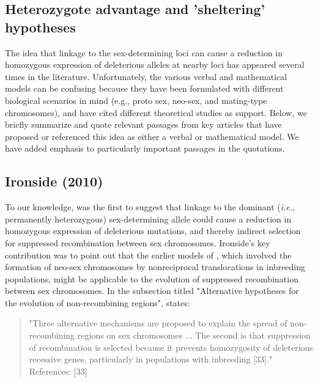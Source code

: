 \documentclass{article}
\begin{document}
\begin{appendices}
 \section{Heterozygote advantage and 'sheltering' hypotheses} \label{Sheltering-App}
 \renewcommand{\theequation}{A\arabic{equation}}
 \setcounter{equation}{0}
 \renewcommand{\thefigure}{A\arabic{figure}}
 \setcounter{figure}{0}

The idea that linkage to the sex-determining loci can cause a reduction in homozygous expression of deleterious alleles at nearby loci has appeared several times in the literature. Unfortunately, the various verbal and mathematical models can be confusing because they have been formulated with different biological scenarios in mind (e.g., proto sex, neo-sex, and mating-type chromosomes), and have cited different theoretical studies as support. Below, we briefly summarize and quote relevant passages from key articles that have proposed or referenced this idea as either a verbal or mathematical model. We have added emphasis to particularly important passages in the quotations.


\subsection*{Ironside (2010)}

To our knowledge, \citet{Ironside2010} was the first to suggest that linkage to the dominant ({\itshape i.e.}, permanently heterozygous) sex-determining allele could cause a reduction in homozygous expression of deleterious mutations, and thereby indirect selection for suppressed recombination between sex chromosomes. Ironside's key contribution was to point out that the earlier models of \citet{CharlesworthWall1999}, which involved the formation of neo-sex chromosomes by nonreciprocal translocations in inbreeding populations, might be applicable to the evolution of suppressed recombination between sex chromosomes. In the subsection titled "Alternative hypotheses for the evolution of non-recombining regions", \citet{Ironside2010} states:
	\begin{quote} 
		"Three alternative mechanisms are proposed to explain the spread of non-recombining regions on sex chromosomes ... The second is that suppression of recombination is selected because it prevents homozygosity of deleterious recessive genes, particularly in populations with inbreeding [33]."\\
		\footnotesize{References: [33] \citet{CharlesworthWall1999}}
	\end{quote}


\end{appendices}
\end{document}
